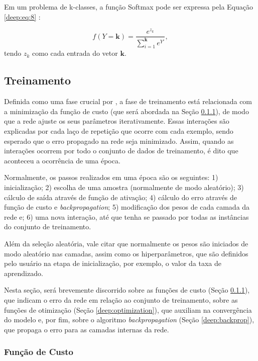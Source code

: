 Em um problema de k-classes, a função Softmax pode ser expressa pela Equação \ref{deep:eq:8} \citep{kotu2018data}:

\begin{equation}
    \label{deep:eq:8}
    f(Y = \boldsymbol{k}) = \frac{e^{z_k}}{\sum_{i=1}^{\boldsymbol{k}} e^{Y'}},
\end{equation}
tendo $z_k$ como cada entrada do vetor $\boldsymbol{k}$.


\subsection{Treinamento}
\label{deep:train}

Definida como uma fase crucial por \cite{ponti2018funciona}, a fase de treinamento está relacionada com a minimização da função de custo (que será abordada na Seção \ref{deep:cust}), de modo que a rede ajuste os seus parâmetros iterativamente. Essas interações são explicadas por cada laço de repetição que ocorre com cada exemplo, sendo esperado que o erro propagado na rede seja minimizado. Assim, quando as interações ocorrem por todo o conjunto de dados de treinamento, é dito que aconteceu a ocorrência de uma época.

Normalmente, os passos realizados em uma época são os seguintes: 1) inicialização; 2) escolha de uma amostra (normalmente de modo aleatório); 3) cálculo de saída através de função de ativação; 4) cálculo do erro através de função de custo e \textit{backpropagation}; 5) modificação dos pesos de cada camada da rede e; 6) uma nova interação, até que tenha se passado por todas as instâncias do conjunto de treinamento.

Além da seleção aleatória, vale citar que normalmente os pesos são iniciados de modo aleatório nas camadas, assim como os hiperparâmetros, que são definidos pelo usuário na etapa de inicialização, por exemplo, o valor da taxa de aprendizado.

Nesta seção, será brevemente discorrido sobre as funções de custo (Seção \ref{deep:cust}), que indicam o erro da rede em relação ao conjunto de treinamento, sobre as funções de otimização (Seção \ref{deep:optimization}), que auxiliam na convergência do modelo e, por fim, sobre o algoritmo \textit{backpropagation} (Seção \ref{deep:backprop}), que propaga o erro para as camadas internas da rede.


\subsubsection{Função de Custo}
\label{deep:cust}

